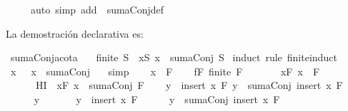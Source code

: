 \begin{isabellebody}
\ \ \ \ \ {\isacharparenleft}auto\ simp\ add{\isacharcolon}\ \ sumaConj{\isacharunderscore}def{\isacharparenright}%
\endisatagproof
{\isafoldproof}%
%
\isadelimproof
%
\endisadelimproof
%
\isadelimdocument
%
\endisadelimdocument
%
\isatagdocument
%
\isamarkuptrue%
%
\endisatagdocument
{\isafolddocument}%
%
\isadelimdocument
%
\endisadelimdocument
%
\begin{isamarkuptext}%
La demostración declarativa es:%
\end{isamarkuptext}\isamarkuptrue%
\isamarkupfalse%
\ sumaConj{\isacharunderscore}acota{\isacharcolon}\ \isanewline
\ \ {\isachardoublequoteopen}finite\ S\ {\isasymLongrightarrow}\ {\isasymforall}x{\isasymin}S{\isachardot}\ x\ {\isasymle}\ sumaConj\ S{\isachardoublequoteclose}\isanewline
%
\isadelimproof
%
\endisadelimproof
%
\isatagproof
{}\isamarkupfalse%
\ {\isacharparenleft}induct\ rule{\isacharcolon}\ finite{\isacharunderscore}induct{\isacharparenright}\isanewline
\ \ \isamarkupfalse%
\ {\isachardoublequoteopen}{\isasymforall}x\ {\isasymin}\ {\isacharbraceleft}{\isacharbraceright}{\isachardot}\ x\ {\isasymle}\ sumaConj\ {\isacharbraceleft}{\isacharbraceright}{\isachardoublequoteclose}\ \isamarkupfalse%
\ simp\isanewline
{}\isamarkupfalse%
\isanewline
\ \ \isamarkupfalse%
\ x\ \ F\isanewline
\ \ \isamarkupfalse%
\ fF{\isacharcolon}\ {\isachardoublequoteopen}finite\ F{\isachardoublequoteclose}\ \isanewline
\ \ \ \ \ \ xF{\isacharcolon}\ {\isachardoublequoteopen}x\ {\isasymnotin}\ F{\isachardoublequoteclose}\ \isanewline
\ \ \ \ \ \ HI{\isacharcolon}\ {\isachardoublequoteopen}{\isasymforall}\ x{\isasymin}F{\isachardot}\ x\ {\isasymle}\ sumaConj\ F{\isachardoublequoteclose}\isanewline
\ \ \isamarkupfalse%
\ {\isachardoublequoteopen}{\isasymforall}y\ {\isasymin}\ insert\ x\ F{\isachardot}\ y\ {\isasymle}\ sumaConj\ {\isacharparenleft}insert\ x\ F{\isacharparenright}{\isachardoublequoteclose}\isanewline
\ \ \isamarkupfalse%
\ \isanewline
\ \ \ \ \isamarkupfalse%
\ y\ \isanewline
\ \ \ \ \isamarkupfalse%
\ {\isachardoublequoteopen}y\ {\isasymin}\ insert\ x\ F{\isachardoublequoteclose}\isanewline
\ \ \ \ \isamarkupfalse%
\ {\isachardoublequoteopen}y\ {\isasymle}\ sumaConj\ {\isacharparenleft}insert\ x\ F{\isacharparenright}{\isachardoublequoteclose}\isanewline
\ \ \ \ \isamarkupfalse%

\end{isabellebody}
